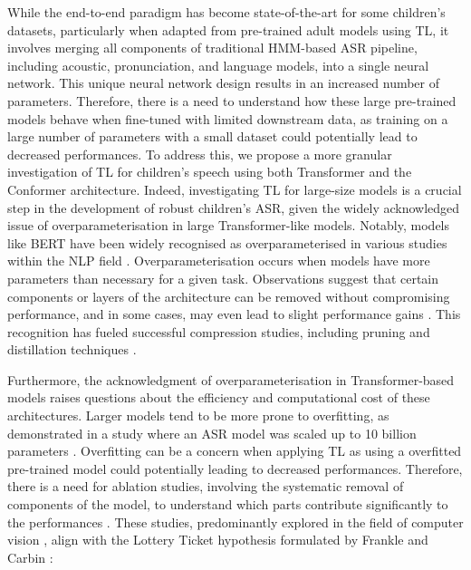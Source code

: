 While the end-to-end paradigm has become state-of-the-art for some children's datasets, particularly when adapted from pre-trained adult models using TL, it involves merging all components of traditional \ac{HMM}-based \ac{ASR} pipeline, including acoustic, pronunciation, and language models, into a single neural network. This unique neural network design results in an increased number of parameters. Therefore, there is a need to understand how these large pre-trained models behave when fine-tuned with limited downstream data, as training on a large number of parameters with a small dataset could potentially lead to decreased performances. To address this, we propose a more granular investigation of \ac{TL} for children's speech using both Transformer and the Conformer architecture.
Indeed, investigating \ac{TL} for large-size models is a crucial step in the development of robust children's \ac{ASR}, given the widely acknowledged issue of overparameterisation in large Transformer-like models. Notably, models like \ac{BERT} \cite{Bert} have been widely recognised as overparameterised in various studies within the \ac{NLP} field \cite{kovaleva-etal-2019-revealing,michel2019sixteen}. Overparameterisation occurs when models have more parameters than necessary for a given task. Observations suggest that certain components or layers of the architecture can be removed without compromising performance, and in some cases, may even lead to slight performance gains \cite{kovaleva-etal-2019-revealing,michel2019sixteen,ye2023partial}. This recognition has fueled successful compression studies, including pruning and distillation techniques \cite{mccarley2019structured,sanh2019distilbert}. 

Furthermore, the acknowledgment of overparameterisation in Transformer-based models raises questions about the efficiency and computational cost of these architectures. Larger models tend to be more prone to overfitting, as demonstrated in a study where an \ac{ASR} model was scaled up to 10 billion parameters \cite{zheng22d_interspeech}. Overfitting can be a concern when applying \ac{TL} as using a overfitted pre-trained model could potentially  leading to decreased performances. Therefore, there is a need for ablation studies, involving the systematic removal of components of the model, to understand which parts contribute significantly to the performances \cite{shen2021partial,wang2021fine}. These studies, predominantly explored in the field of computer vision \cite{ye2023partial}, align with the Lottery Ticket hypothesis formulated by Frankle and Carbin \cite{frankle2018lottery}: 

